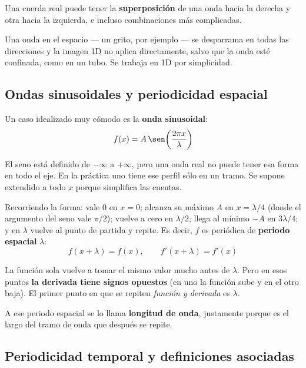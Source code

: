 \documentclass[12pt,a4paper]{article}
\begin{document}


Una cuerda real puede tener la \textbf{superposición} de una onda hacia la
derecha y otra hacia la izquierda, e incluso combinaciones más complicadas.

\begin{notebox}
Una onda en el espacio --- un grito, por ejemplo --- se desparrama en todas
las direcciones y la imagen 1D no aplica directamente, salvo que la onda esté
confinada, como en un tubo. Se trabaja en 1D por simplicidad.
\end{notebox}

\subsection{Ondas sinusoidales y periodicidad espacial}

Un caso idealizado muy cómodo es la \textbf{onda sinusoidal}:
\[
f(x) = A\,\sen\!\left(\frac{2\pi x}{\lambda}\right)
\]

\begin{notebox}
El seno está definido de $-\infty$ a $+\infty$, pero una onda real no puede
tener esa forma en todo el eje. En la práctica uno tiene ese perfil sólo en
un tramo. Se supone extendido a todo $x$ porque simplifica las cuentas.
\end{notebox}

Recorriendo la forma: vale $0$ en $x=0$; alcanza su máximo $A$ en
$x = \lambda/4$ (donde el argumento del seno vale $\pi/2$); vuelve a cero en
$\lambda/2$; llega al mínimo $-A$ en $3\lambda/4$; y en $\lambda$ vuelve al
punto de partida y repite. Es decir, $f$ es periódica de \textbf{periodo
espacial} $\lambda$:
\[
f(x + \lambda) = f(x), \qquad f'(x + \lambda) = f'(x)
\]

\begin{warnbox}
La función sola vuelve a tomar el mismo valor mucho antes de $\lambda$. Pero
en esos puntos \textbf{la derivada tiene signos opuestos} (en uno la función
sube y en el otro baja). El primer punto en que se repiten \emph{función y
derivada} es $\lambda$.
\end{warnbox}

A ese periodo espacial se lo llama \textbf{longitud de onda}, justamente
porque es el largo del tramo de onda que después se repite.

\subsection{Periodicidad temporal y definiciones asociadas}
\end{document}

